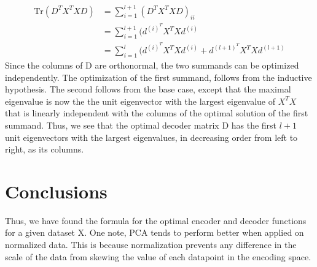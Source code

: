 \documentclass[12pt]{article}
\begin{document}
\begin{align*}
    \text{Tr}(D^TX^TXD) &= \displaystyle \sum_{i = 1}^{l + 1}(D^TX^TXD)_{ii} \\
                        &= \displaystyle \sum_{i = 1}^{l + 1}(d^{(i)^T}X^TXd^{(i)} \\
                        &= \displaystyle \sum_{i = 1}^l(d^{(i)^T}X^TXd^{(i)} + d^{(l+1)^T}X^TXd^{(l + 1)}
\end{align*}
Since the columns of D are orthonormal, the two summands can be optimized independently. The optimization of the first summand, follows from the inductive hypothesis. The second follows from the base case, except that the maximal eigenvalue is now the the unit eigenvector with the largest eigenvalue of  $X^TX$ that is linearly independent with the columns of the optimal solution of the first summand. Thus, we see that the optimal decoder matrix D has the first $l + 1$ unit eigenvectors with the largest eigenvalues, in decreasing order from left to right, as its columns.

\section*{Conclusions}
Thus, we have found the formula for the optimal encoder and decoder functions for a given dataset X. One note, PCA tends to perform better when applied on normalized data. This is because normalization prevents any difference in the scale of the data from skewing the value of each datapoint in the encoding space.
\end{document}
